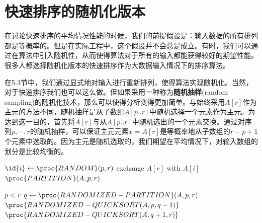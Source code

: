 \documentclass[a4paper,11pt]{ctexbook}
\begin{document}
\section{快速排序的随机化版本}
在讨论快速排序的平均情况性能的时候，我们的前提假设是：输入数据的所有排列都是等概率的。但是在实际工程中，这个假设并不会总是成立。有时，我们可以通过在算法中引入随机性，从而使得算法对于所有的输入都能获得较好的期望性能。很多人都选择随机化版本的快速排序作为大数据输入情况下的排序算法。

在5.3节中，我们通过显式地对输入进行重新排列，使得算法实现随机化。当然，对于快速排序我们也可以这么做。但如果采用一种称为\textbf{随机抽样}(random sampling)的随机化技术，那么可以使得分析变得更加简单。与始终采用$ A[r] $作为主元的方法不同，随机抽样是从子数组$ A[p..r] $中随机选择一个元素作为主元。为达到这一目的，首先将$ A[r] $与从$ A[p..r] $中随机选出的一个元素交换。通过对序列$ p,\cdots,r $的随机抽样，可以保证主元元素$ x=A[r] $是等概率地从子数组的$ r-p+1 $个元素中选取的。因为主元是随机选取的，我们期望在平均情况下，对输入数组的划分是比较均衡的。
\begin{codebox}
	\li $ \id{i} \gets \proc{RANDOM}(p,r)$
	\li exchange $ A[r] $ with $ A[i] $
	\li \Return $ \proc{PARTITION}(A,p,r) $
\end{codebox}
\begin{codebox}
	\li \If $ p<r $
	\li \Then
		 $q\gets \proc{RANDOMIZED-PARTITION}(A,p,r) $
	\li	 $\proc{RANDOMIZED-QUICKSORT(A,p,q-1)} $
	\li  $\proc{RANDOMIZED-QUICKSORT(A,q+1,r)} $	
		\End 
\end{codebox}
\end{document}
